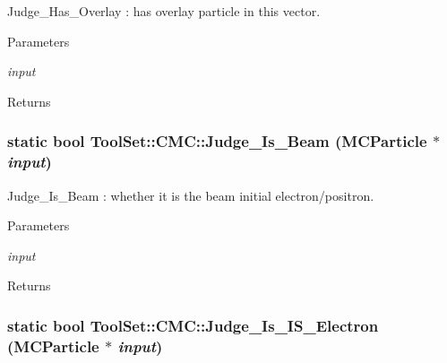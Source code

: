 Judge\_\-Has\_\-Overlay : has overlay particle in this vector. 
\begin{DoxyParams}{Parameters}
\item[{\em input}]\end{DoxyParams}
\begin{DoxyReturn}{Returns}

\end{DoxyReturn}
\hypertarget{classToolSet_1_1CMC_aa63f12865d46af350674c7dca3eb5437}{
\subsubsection[{Judge\_\-Is\_\-Beam}]{\setlength{\rightskip}{0pt plus 5cm}static bool ToolSet::CMC::Judge\_\-Is\_\-Beam (MCParticle $\ast$ {\em input})}}
\label{classToolSet_1_1CMC_aa63f12865d46af350674c7dca3eb5437}


Judge\_\-Is\_\-Beam : whether it is the beam initial electron/positron. 
\begin{DoxyParams}{Parameters}
\item[{\em input}]\end{DoxyParams}
\begin{DoxyReturn}{Returns}

\end{DoxyReturn}
\hypertarget{classToolSet_1_1CMC_a0630c44bcd0eaf761f4b34e106f2b9d9}{
\subsubsection[{Judge\_\-Is\_\-IS\_\-Electron}]{\setlength{\rightskip}{0pt plus 5cm}static bool ToolSet::CMC::Judge\_\-Is\_\-IS\_\-Electron (MCParticle $\ast$ {\em input})}}
\label{classToolSet_1_1CMC_a0630c44bcd0eaf761f4b34e106f2b9d9}


